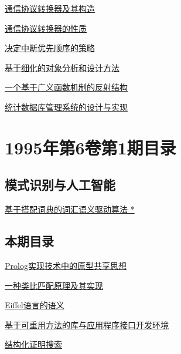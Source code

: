 \documentclass[a4paper]{article}
\begin{document}
\href{http://www.jos.org.cn/ch/reader/download_pdf.aspx?file_no=19950205&year_id=1995&quarter_id=2&falg=1}{通信协议转换器及其构造}

\href{http://www.jos.org.cn/ch/reader/download_pdf.aspx?file_no=19950206&year_id=1995&quarter_id=2&falg=1}{通信协议转换器的性质}

\href{http://www.jos.org.cn/ch/reader/download_pdf.aspx?file_no=19950207&year_id=1995&quarter_id=2&falg=1}{决定中断优先顺序的策略}

\href{http://www.jos.org.cn/ch/reader/download_pdf.aspx?file_no=19950208&year_id=1995&quarter_id=2&falg=1}{基于细化的对象分析和设计方法}

\href{http://www.jos.org.cn/ch/reader/download_pdf.aspx?file_no=19950209&year_id=1995&quarter_id=2&falg=1}{一个基于广义函数机制的反射结构}

\href{http://www.jos.org.cn/ch/reader/download_pdf.aspx?file_no=19950210&year_id=1995&quarter_id=2&falg=1}{统计数据库管理系统的设计与实现}


\section{\textbf{1995年第6卷第1期目录}}
\subsection{模式识别与人工智能}
\href{http://www.jos.org.cn/ch/reader/download_pdf.aspx?file_no=zk78&year_id=1995&quarter_id=1&falg=1}{基于搭配词典的词汇语义驱动算法 *}

\subsection{本期目录}
\href{http://www.jos.org.cn/ch/reader/download_pdf.aspx?file_no=19950101&year_id=1995&quarter_id=1&falg=1}{Prolog实现技术中的原型共享思想}

\href{http://www.jos.org.cn/ch/reader/download_pdf.aspx?file_no=19950102&year_id=1995&quarter_id=1&falg=1}{一种类比匹配原理及其实现}

\href{http://www.jos.org.cn/ch/reader/download_pdf.aspx?file_no=19950103&year_id=1995&quarter_id=1&falg=1}{Eiffel语言的语义}

\href{http://www.jos.org.cn/ch/reader/download_pdf.aspx?file_no=19950104&year_id=1995&quarter_id=1&falg=1}{基于可重用方法的库与应用程序接口开发环境}

\href{http://www.jos.org.cn/ch/reader/download_pdf.aspx?file_no=19950105&year_id=1995&quarter_id=1&falg=1}{结构化证明搜索}
\end{document}
